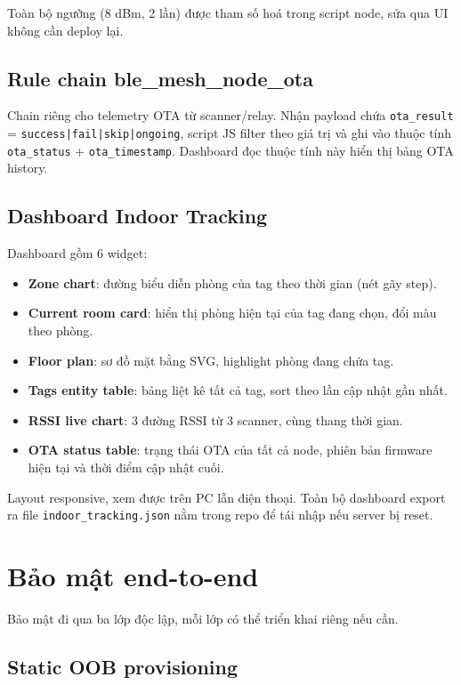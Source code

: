 Toàn bộ ngưỡng (8 dBm, 2 lần) được tham số hoá trong script node, sửa qua UI không cần deploy lại.

\subsection{Rule chain ble\_mesh\_node\_ota}

Chain riêng cho telemetry OTA từ scanner/relay. Nhận payload chứa \texttt{ota\_result} = \texttt{success|fail|skip|ongoing}, script JS filter theo giá trị và ghi vào thuộc tính \texttt{ota\_status} + \texttt{ota\_timestamp}. Dashboard đọc thuộc tính này hiển thị bảng OTA history.

\subsection{Dashboard Indoor Tracking}

Dashboard gồm 6 widget:

\begin{itemize}
    \item \textbf{Zone chart}: đường biểu diễn phòng của tag theo thời gian (nét gãy step).
    \item \textbf{Current room card}: hiển thị phòng hiện tại của tag đang chọn, đổi màu theo phòng.
    \item \textbf{Floor plan}: sơ đồ mặt bằng SVG, highlight phòng đang chứa tag.
    \item \textbf{Tags entity table}: bảng liệt kê tất cả tag, sort theo lần cập nhật gần nhất.
    \item \textbf{RSSI live chart}: 3 đường RSSI từ 3 scanner, cùng thang thời gian.
    \item \textbf{OTA status table}: trạng thái OTA của tất cả node, phiên bản firmware hiện tại và thời điểm cập nhật cuối.
\end{itemize}

Layout responsive, xem được trên PC lẫn điện thoại. Toàn bộ dashboard export ra file \texttt{indoor\_tracking.json} nằm trong repo để tái nhập nếu server bị reset.

\section{Bảo mật end-to-end}

Bảo mật đi qua ba lớp độc lập, mỗi lớp có thể triển khai riêng nếu cần.

\subsection{Static OOB provisioning}


